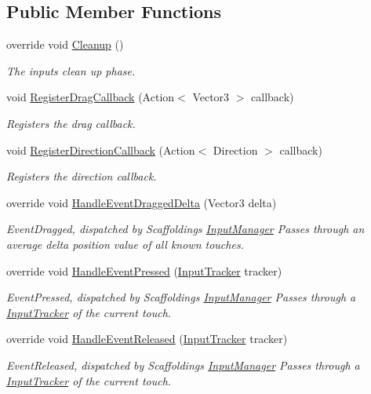 \subsection*{Public Member Functions}
\begin{DoxyCompactItemize}
\item 
override void \hyperlink{class_scaffolding_1_1_drag_input_aff15e6ed3bca67228c44918a544e241b}{Cleanup} ()
\begin{DoxyCompactList}\small\item\em The inputs clean up phase. \end{DoxyCompactList}\item 
void \hyperlink{class_scaffolding_1_1_drag_input_aa14faf0a305db966f957bb59ab5de1ff}{Register\+Drag\+Callback} (Action$<$ Vector3 $>$ callback)
\begin{DoxyCompactList}\small\item\em Registers the drag callback. \end{DoxyCompactList}\item 
void \hyperlink{class_scaffolding_1_1_drag_input_a5f46ef8ef277a59f91ce14eb725af851}{Register\+Direction\+Callback} (Action$<$ Direction $>$ callback)
\begin{DoxyCompactList}\small\item\em Registers the direction callback. \end{DoxyCompactList}\item 
override void \hyperlink{class_scaffolding_1_1_drag_input_a600650eb9b2e3ce954af6a5982db3360}{Handle\+Event\+Dragged\+Delta} (Vector3 delta)
\begin{DoxyCompactList}\small\item\em Event\+Dragged, dispatched by Scaffoldings \hyperlink{class_scaffolding_1_1_input_manager}{Input\+Manager} Passes through an average delta position value of all known touches. \end{DoxyCompactList}\item 
override void \hyperlink{class_scaffolding_1_1_drag_input_a49561ec761c72584711384d57cb74f41}{Handle\+Event\+Pressed} (\hyperlink{class_scaffolding_1_1_input_tracker}{Input\+Tracker} tracker)
\begin{DoxyCompactList}\small\item\em Event\+Pressed, dispatched by Scaffoldings \hyperlink{class_scaffolding_1_1_input_manager}{Input\+Manager} Passes through a \hyperlink{class_scaffolding_1_1_input_tracker}{Input\+Tracker} of the current touch. \end{DoxyCompactList}\item 
override void \hyperlink{class_scaffolding_1_1_drag_input_ab50a7059961c803e39e3ce9ffb0945d7}{Handle\+Event\+Released} (\hyperlink{class_scaffolding_1_1_input_tracker}{Input\+Tracker} tracker)
\begin{DoxyCompactList}\small\item\em Event\+Released, dispatched by Scaffoldings \hyperlink{class_scaffolding_1_1_input_manager}{Input\+Manager} Passes through a \hyperlink{class_scaffolding_1_1_input_tracker}{Input\+Tracker} of the current touch. \end{DoxyCompactList}\end{DoxyCompactItemize}
